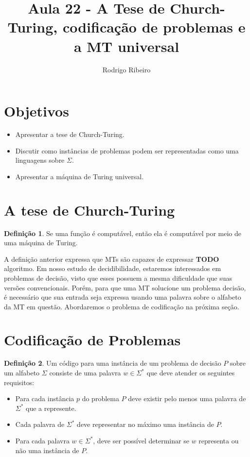 \documentclass[a4paper]{article}
\theoremstyle{definition}
\newtheorem{Definition}{Definição}
\begin{document}
\title{Aula 22 - A Tese de Church-Turing, codificação de problemas e a MT universal}
  \author{Rodrigo Ribeiro}

  \maketitle

  \pagestyle{fancy}


  \section*{Objetivos}

  \begin{itemize}
     \item Apresentar a tese de Church-Turing.
     \item Discutir como instâncias de problemas podem ser representadas como
           uma linguagens sobre $\Sigma$.
     \item Apresentar a máquina de Turing universal.
  \end{itemize}


  \section{A tese de Church-Turing}

  \begin{Definition}
    Se uma função é computável, então ela é computável por meio de uma máquina
    de Turing.
  \end{Definition}

  A definição anterior expressa que MTs são capazes de expressar \textbf{TODO}
  algoritmo. Em nosso estudo de decidibilidade, estaremos interessados em
  problemas de decisão, visto que esses possuem a mesma dificuldade que suas
  versões convencionais. Porém, para que uma MT solucione um problema decisão, é
  necessário que sua entrada seja expressa usando uma palavra sobre o alfabeto
  da MT em questão. Abordaremos o problema de codificação na próxima seção.


  \section{Codificação de Problemas}

  \begin{Definition}
    Um código para uma instância de um problema de decisão $P$ sobre um alfabeto
    $\Sigma$ consiste de uma palavra $w\in\Sigma^*$ que deve atender
    os
    seguintes requisitos:
    \begin{itemize}
      \item Para cada instância $p$ do problema $P$ deve existir pelo menos uma
        palavra de $\Sigma^*$ que a represente.
      \item Cada palavra de $\Sigma^*$ deve representar no máximo uma instância
        de $P$.
      \item Para cada palavra $w\in\Sigma^*$, deve ser possível determinar se
        $w$ representa ou não uma instância de $P$. 
    \end{itemize}
  \end{Definition}
  
\end{document}
